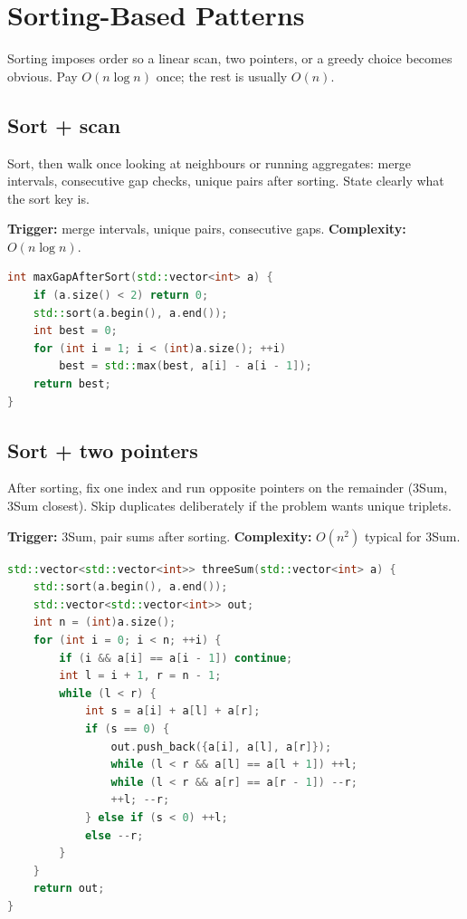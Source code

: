 \section{Sorting-Based Patterns}
\label{sec:pat-sorting}
Sorting imposes order so a linear scan, two pointers, or a greedy choice becomes
obvious. Pay $O(n\log n)$ once; the rest is usually $O(n)$.

\subsection{Sort + scan}
\label{subsec:pat-sort-scan}
Sort, then walk once looking at neighbours or running aggregates: merge
intervals, consecutive gap checks, unique pairs after sorting. State clearly
what the sort key is.

\textbf{Trigger:} merge intervals, unique pairs, consecutive gaps.
\newline
\textbf{Complexity:} $O(n\log n)$.

\begin{lstlisting}[language=C++]
int maxGapAfterSort(std::vector<int> a) {
    if (a.size() < 2) return 0;
    std::sort(a.begin(), a.end());
    int best = 0;
    for (int i = 1; i < (int)a.size(); ++i)
        best = std::max(best, a[i] - a[i - 1]);
    return best;
}
\end{lstlisting}

\subsection{Sort + two pointers}
\label{subsec:pat-sort-two-ptr}
After sorting, fix one index and run opposite pointers on the remainder
(3Sum, 3Sum closest). Skip duplicates deliberately if the problem wants unique
triplets.

\textbf{Trigger:} 3Sum, pair sums after sorting.
\newline
\textbf{Complexity:} $O(n^2)$ typical for 3Sum.

\begin{lstlisting}[language=C++]
std::vector<std::vector<int>> threeSum(std::vector<int> a) {
    std::sort(a.begin(), a.end());
    std::vector<std::vector<int>> out;
    int n = (int)a.size();
    for (int i = 0; i < n; ++i) {
        if (i && a[i] == a[i - 1]) continue;
        int l = i + 1, r = n - 1;
        while (l < r) {
            int s = a[i] + a[l] + a[r];
            if (s == 0) {
                out.push_back({a[i], a[l], a[r]});
                while (l < r && a[l] == a[l + 1]) ++l;
                while (l < r && a[r] == a[r - 1]) --r;
                ++l; --r;
            } else if (s < 0) ++l;
            else --r;
        }
    }
    return out;
}
\end{lstlisting}

